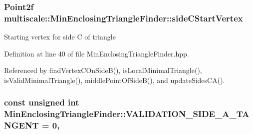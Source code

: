 \hypertarget{classmultiscale_1_1MinEnclosingTriangleFinder_a877d0c34c4803643699d8fd176c24d4e}{
\subsubsection[{side\-C\-Start\-Vertex}]{\setlength{\rightskip}{0pt plus 5cm}Point2f multiscale\-::\-Min\-Enclosing\-Triangle\-Finder\-::side\-C\-Start\-Vertex\hspace{0.3cm}{\ttfamily [private]}}}\label{classmultiscale_1_1MinEnclosingTriangleFinder_a877d0c34c4803643699d8fd176c24d4e}
Starting vertex for side C of triangle 

Definition at line 40 of file Min\-Enclosing\-Triangle\-Finder.\-hpp.



Referenced by find\-Vertex\-C\-On\-Side\-B(), is\-Local\-Minimal\-Triangle(), is\-Valid\-Minimal\-Triangle(), middle\-Point\-Of\-Side\-B(), and update\-Sides\-C\-A().

\hypertarget{classmultiscale_1_1MinEnclosingTriangleFinder_a811859188bd18d46ee6906ad4d958b3a}{
\subsubsection[{V\-A\-L\-I\-D\-A\-T\-I\-O\-N\-\_\-\-S\-I\-D\-E\-\_\-\-A\-\_\-\-T\-A\-N\-G\-E\-N\-T}]{\setlength{\rightskip}{0pt plus 5cm}const unsigned int Min\-Enclosing\-Triangle\-Finder\-::\-V\-A\-L\-I\-D\-A\-T\-I\-O\-N\-\_\-\-S\-I\-D\-E\-\_\-\-A\-\_\-\-T\-A\-N\-G\-E\-N\-T = 0\hspace{0.3cm}{\ttfamily [static]}, {\ttfamily [private]}}}\label{classmultiscale_1_1MinEnclosingTriangleFinder_a811859188bd18d46ee6906ad4d958b3a}


